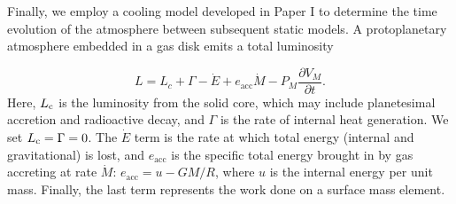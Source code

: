 \documentclass[apj]{emulateapj}
\newcommand{\co}{_{\rm c}}
\begin{document}






Finally, we employ a cooling model developed in Paper I to determine the time evolution of the atmosphere between subsequent static models. A protoplanetary atmosphere embedded in a gas disk emits a total luminosity

\begin{equation}
\label{eq:coolingglobal}
L=L_c+\Gamma-\dot{E}+e_{\mathrm{acc}}\dot{M}-P_M \frac{\partial V_M}{\partial t}.
\end{equation}
Here, $L_{\rm c}$ is the luminosity from the solid core, which may include planetesimal accretion and radioactive decay, and $\Gamma$ is the rate of internal heat generation. We set $L\co=\Gamma=0$. The $\dot{E}$ term is the rate at which total energy (internal and gravitational) is lost, and $e_{\mathrm{acc}}$ is the specific total energy brought in by gas accreting at rate $\dot{M}$: $e_{\mathrm{acc}}=u-G M/R$, where $u$ is the internal energy per unit mass. Finally, the last term represents the work done on a surface mass element. 
\end{document}

